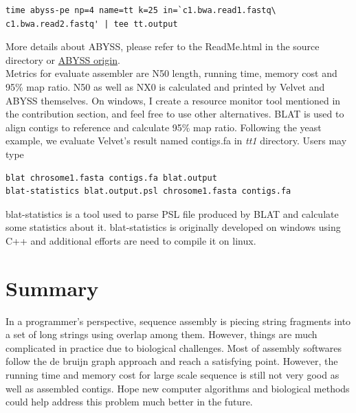 \documentclass{article}
\begin{document}
\begin{lstlisting}
time abyss-pe np=4 name=tt k=25 in=`c1.bwa.read1.fastq\
c1.bwa.read2.fastq' | tee tt.output
\end{lstlisting}
More details about ABYSS, please refer to the ReadMe.html in the source directory or \href{https://github.com/sjackman/abyss}{ABYSS origin}.\\
Metrics for evaluate assembler are N50 length, running time, memory cost and 95\% map ratio. N50 as well as NX0 is calculated and printed by Velvet and ABYSS themselves. On windows, I create a resource monitor tool mentioned in the contribution section, and feel free to use other alternatives. BLAT is used to align contigs to reference and calculate 95\% map ratio. Following the yeast example, we evaluate Velvet's result named contigs.fa in \emph{tt1} directory. Users may type
\begin{lstlisting}
blat chrosome1.fasta contigs.fa blat.output
blat-statistics blat.output.psl chrosome1.fasta contigs.fa
\end{lstlisting}
blat-statistics is a tool used to parse PSL file produced by BLAT and calculate some statistics about it. blat-statistics is originally developed on windows using C++ and additional efforts are need to compile it on linux.
\section{Summary}
In a programmer's perspective, sequence assembly is piecing string fragments into a set of long strings using overlap among them. However, things are much complicated in practice due to biological challenges. Most of assembly softwares follow the de bruijn graph approach and reach a satisfying point. However, the running time and memory cost for large scale sequence is still not very good as well as assembled contigs. Hope new computer algorithms and biological methods could help address this problem much better in the future.
\renewcommand\refname{Reference}


\end{document}
